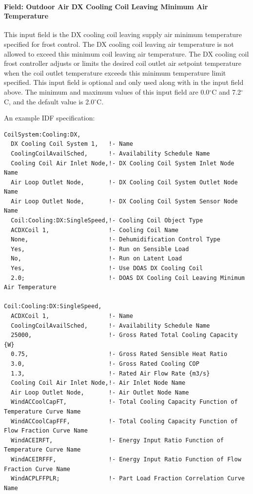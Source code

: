 \paragraph{Field: Outdoor Air DX Cooling Coil Leaving Minimum Air Temperature}\label{field-outdoor-air-dx-cooling-coil-leaving-minimum-air-temperature}

This input field is the DX cooling coil leaving supply air minimum temperature specified for frost control. The DX cooling coil leaving air temperature is not allowed to exceed this minimum coil leaving air temperature. The DX cooling coil frost controller adjusts or limits the desired coil outlet air setpoint temperature when the coil outlet temperature exceeds this minimum temperature limit specified. This input field is optional and only used along with in the input field above. The minimum and maximum values of this input field are 0.0$^\circ$C and 7.2$^\circ$C, and the default value is 2.0$^\circ$C.

An example IDF specification:

\begin{lstlisting}
CoilSystem:Cooling:DX,
  DX Cooling Coil System 1,   !- Name
  CoolingCoilAvailSched,      !- Availability Schedule Name
  Cooling Coil Air Inlet Node,!- DX Cooling Coil System Inlet Node Name
  Air Loop Outlet Node,       !- DX Cooling Coil System Outlet Node Name
  Air Loop Outlet Node,       !- DX Cooling Coil System Sensor Node Name
  Coil:Cooling:DX:SingleSpeed,!- Cooling Coil Object Type
  ACDXCoil 1,                 !- Cooling Coil Name
  None,                       !- Dehumidification Control Type
  Yes,                        !- Run on Sensible Load
  No,                         !- Run on Latent Load
  Yes,                        !- Use DOAS DX Cooling Coil
  2.0;                        !- DOAS DX Cooling Coil Leaving Minimum Air Temperature

Coil:Cooling:DX:SingleSpeed,
  ACDXCoil 1,                 !- Name
  CoolingCoilAvailSched,      !- Availability Schedule Name
  25000,                      !- Gross Rated Total Cooling Capacity {W}
  0.75,                       !- Gross Rated Sensible Heat Ratio
  3.0,                        !- Gross Rated Cooling COP
  1.3,                        !- Rated Air Flow Rate {m3/s}
  Cooling Coil Air Inlet Node,!- Air Inlet Node Name
  Air Loop Outlet Node,       !- Air Outlet Node Name
  WindACCoolCapFT,            !- Total Cooling Capacity Function of Temperature Curve Name
  WindACCoolCapFFF,           !- Total Cooling Capacity Function of Flow Fraction Curve Name
  WindACEIRFT,                !- Energy Input Ratio Function of Temperature Curve Name
  WindACEIRFFF,               !- Energy Input Ratio Function of Flow Fraction Curve Name
  WindACPLFFPLR;              !- Part Load Fraction Correlation Curve Name
\end{lstlisting}

